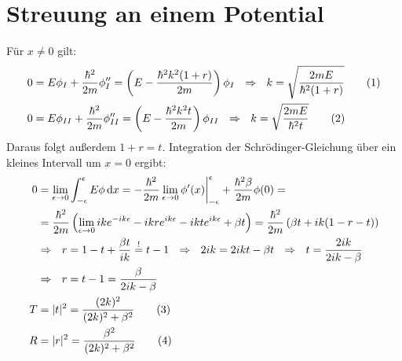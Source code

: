 \documentclass[a4paper,12pt]{article}
\newcommand\numberthis{\addtocounter{equation}{1}\tag{\theequation}}
\newcommand{\intx}{}
\newcommand{\kla}{}
\begin{document}
\section{Streuung an einem Potential}
Für $x\neq 0$ gilt:
\begin{align*}
0&=E\phi_I+\frac{\hbar^2}{2m}\phi_I''=\kla\left( {E-\frac{\hbar^2k^2(1+r)}{2m}} \right)\phi_I\ \ \Rightarrow\ \ k=\sqrt{\frac{2mE}{\hbar^2(1+r)}}\numberthis\label{k von E und r} \\
0&=E\phi_{II}+\frac{\hbar^2}{2m}\phi_{II}''=\kla\left( {E-\frac{\hbar^2k^2t}{2m}} \right)\phi_{II}\ \ \Rightarrow\ \ k=\sqrt{\frac{2mE}{\hbar^2t}}\numberthis\label{k von E und t}
\end{align*}
Daraus folgt außerdem $1+r=t$. Integration der Schrödinger-Gleichung über ein kleines Intervall um $x=0$ ergibt:
\begin{align*}
0&=\lim_{\epsilon\rightarrow 0}\intx\int_{-\epsilon}^{\epsilon}E\phi\,\mathrm{d}x=-\frac{\hbar^2}{2m}\lim_{\epsilon\rightarrow 0} \phi'(x)\bigg\vert_{-\epsilon}^\epsilon + \frac{\hbar^2\beta}{2m}\phi(0)= \\
&=\frac{\hbar^2}{2m}\left(\lim_{\epsilon\rightarrow 0}ike^{-ik\epsilon}-ikre^{ik\epsilon}-ikte^{ik\epsilon}+\beta t\right)=\frac{\hbar^2}{2m}\kla\left( {\beta t+ik(1-r-t)} \right) \\
&\Rightarrow\ \ r=1-t+\frac{\beta t}{ik}\overset{!}{=}t-1\ \ \Rightarrow\ \ 2ik=2ikt - \beta t \ \ \Rightarrow\ \ t=\frac{2ik}{2ik-\beta} \\
&\Rightarrow\ \ r=t-1=\frac{\beta}{2ik -\beta}\\
T&=|t|^2=\frac{(2k)^2}{(2k)^2+\beta^2}\numberthis\label{T von E}\\
R&=|r|^2=\frac{\beta^2}{(2k)^2+\beta^2}\numberthis\label{R von E}
\end{align*}
\end{document}
